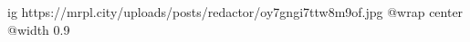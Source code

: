  
 
 
 
 

\ifcmt
  ig https://mrpl.city/uploads/posts/redactor/oy7gngi7ttw8m9of.jpg
  @wrap center
  @width 0.9
\fi

